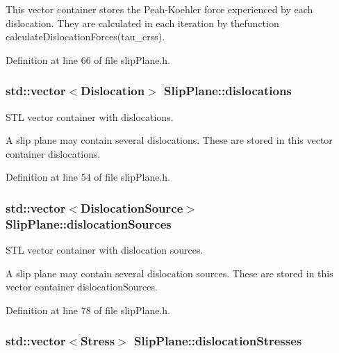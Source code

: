 This vector container stores the Peah-\/\-Koehler force experienced by each dislocation. They are calculated in each iteration by thefunction calculate\-Dislocation\-Forces(tau\-\_\-crss). 

Definition at line 66 of file slip\-Plane.\-h.

\hypertarget{classSlipPlane_ad92c7c409f7e161db449528389180910}{
\subsubsection[{dislocations}]{\setlength{\rightskip}{0pt plus 5cm}std\-::vector$<${\bf Dislocation}$>$ Slip\-Plane\-::dislocations\hspace{0.3cm}{\ttfamily [protected]}}}\label{db/d25/classSlipPlane_ad92c7c409f7e161db449528389180910}


S\-T\-L vector container with dislocations. 

A slip plane may contain several dislocations. These are stored in this vector container dislocations. 

Definition at line 54 of file slip\-Plane.\-h.

\hypertarget{classSlipPlane_a8e31e904fc6e68cc7ba70b0b57a278cc}{
\subsubsection[{dislocation\-Sources}]{\setlength{\rightskip}{0pt plus 5cm}std\-::vector$<${\bf Dislocation\-Source}$>$ Slip\-Plane\-::dislocation\-Sources\hspace{0.3cm}{\ttfamily [protected]}}}\label{db/d25/classSlipPlane_a8e31e904fc6e68cc7ba70b0b57a278cc}


S\-T\-L vector container with dislocation sources. 

A slip plane may contain several dislocation sources. These are stored in this vector container dislocation\-Sources. 

Definition at line 78 of file slip\-Plane.\-h.

\hypertarget{classSlipPlane_adaa1bb736c2912f5e06e7aa4553c1ebd}{
\subsubsection[{dislocation\-Stresses}]{\setlength{\rightskip}{0pt plus 5cm}std\-::vector$<${\bf Stress}$>$ Slip\-Plane\-::dislocation\-Stresses\hspace{0.3cm}{\ttfamily [protected]}}}\label{db/d25/classSlipPlane_adaa1bb736c2912f5e06e7aa4553c1ebd}


